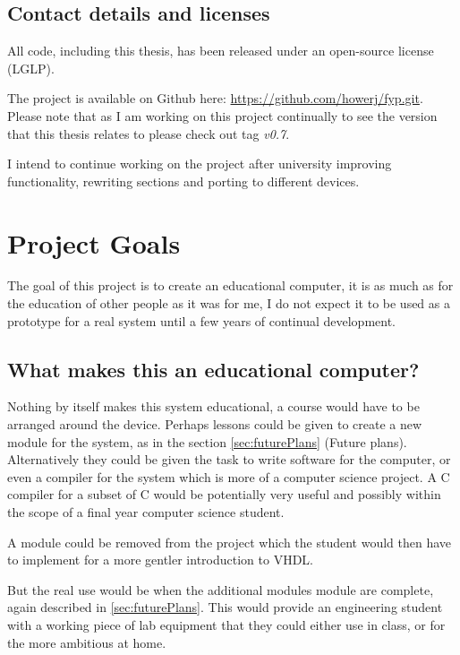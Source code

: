 \documentclass	[a4paper, 10pt]	{article}
\begin{document}
  \subsection{Contact details and licenses}

  All code, including this thesis, has been released under an open-source
  license (LGLP).

  The project is available on Github here: \url{https://github.com/howerj/fyp.git}. Please
  note that as I am working on this project continually to see the version that this
  thesis relates to please check out tag \emph{v0.7}.

  I intend to continue working on the project after university improving functionality,
  rewriting sections and porting to different devices.

  \section{Project Goals}

  The goal of this project is to create an educational computer, it is as much as
  for the education of other people as it was for me, I do not expect it to be used
  as a prototype for a real system until a few years of continual development.

    \subsection{What makes this an educational computer?}

    Nothing by itself makes this system educational, a course would have to be
    arranged around the device. Perhaps lessons could be given to create a new module
    for the system, as in the section \ref{sec:futurePlans} (Future plans). Alternatively
    they could be given the task to write software for the computer, or even a compiler
    for the system which is more of a computer science project. A C compiler for a
    subset of C would be potentially very useful and possibly within the scope of
    a final year computer science student.

    A module could be removed from the project which the student would then have to
    implement for a more gentler introduction to VHDL. 

    But the real use would be when the additional modules module are complete, again
    described in \ref{sec:futurePlans}. This would provide an engineering student
    with a working piece of lab equipment that they could either use in class, or for
    the more ambitious at home.
\end{document}
